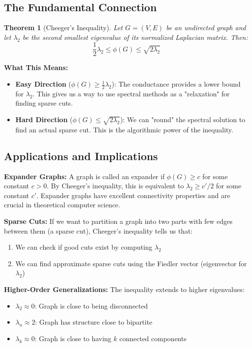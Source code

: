 \documentclass[11pt]{article}
\newtheorem{theorem}{Theorem}
\begin{document}
\subsection{The Fundamental Connection}

\begin{theorem}[Cheeger's Inequality]
Let $G = (V,E)$ be an undirected graph and let $\lambda_2$ be the second smallest eigenvalue of its normalized Laplacian matrix. Then:
$$\frac{1}{2}\lambda_2 \leq \phi(G) \leq \sqrt{2\lambda_2}$$
\end{theorem}

\textbf{What This Means:}
\begin{itemize}
\item \textbf{Easy Direction} ($\phi(G) \geq \frac{1}{2}\lambda_2$): The conductance provides a lower bound for $\lambda_2$. This gives us a way to use spectral methods as a "relaxation" for finding sparse cuts.
\item \textbf{Hard Direction} ($\phi(G) \leq \sqrt{2\lambda_2}$): We can "round" the spectral solution to find an actual sparse cut. This is the algorithmic power of the inequality.
\end{itemize}

\subsection{Applications and Implications}

\textbf{Expander Graphs:} A graph is called an expander if $\phi(G) \geq c$ for some constant $c > 0$. By Cheeger's inequality, this is equivalent to $\lambda_2 \geq c'/2$ for some constant $c'$. Expander graphs have excellent connectivity properties and are crucial in theoretical computer science.

\textbf{Sparse Cuts:} If we want to partition a graph into two parts with few edges between them (a sparse cut), Cheeger's inequality tells us that:
\begin{enumerate}
\item We can check if good cuts exist by computing $\lambda_2$
\item We can find approximate sparse cuts using the Fiedler vector (eigenvector for $\lambda_2$)
\end{enumerate}

\textbf{Higher-Order Generalizations:} The inequality extends to higher eigenvalues:
\begin{itemize}
\item $\lambda_2 \approx 0$: Graph is close to being disconnected
\item $\lambda_n \approx 2$: Graph has structure close to bipartite
\item $\lambda_k \approx 0$: Graph is close to having $k$ connected components
\end{itemize}
\end{document}
